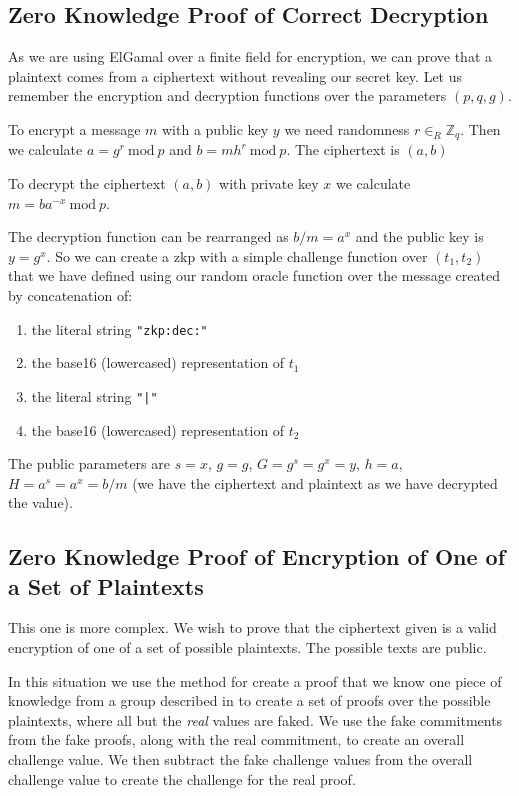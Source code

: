 \subsection*{Zero Knowledge Proof of Correct Decryption}
\label{proc:zkp:dec}

As we are using ElGamal over a finite field for encryption, we can prove that a plaintext comes from a ciphertext without revealing our secret key. Let us remember the encryption and decryption functions over the parameters $(p,q,g)$.

To encrypt a message $m$ with a public key $y$ we need randomness $r \in_{R} \mathbb{Z}_q$. Then we calculate $a = g^r\ \textrm{mod}\ p$ and $b = mh^r\ \textrm{mod}\ p$. The ciphertext is $(a,b)$

To decrypt the ciphertext $(a,b)$ with private key $x$ we calculate $m = ba^{-x}\ \textrm{mod}\ p$.

The decryption function can be rearranged as $b/m = a^x$ and the public key is $y = g^x$. So we can create a \gls{zkp} with a simple challenge function over $(t_1, t_2)$ that we have defined using our random oracle function over the message created by concatenation of:

\begin{enumerate}
    \item the literal string \lstinline[style=ES6]{"zkp:dec:"}
    \item the base16 (lowercased) representation of $t_1$
    \item the literal string \lstinline[style=ES6]{"|"}
    \item the base16 (lowercased) representation of $t_2$
\end{enumerate}

The public parameters are $s = x$, $g = g$, $G = g^s = g^x = y$, $h = a$, $H = a^s = a^x = b/m$ (we have the ciphertext and plaintext as we have decrypted the value).


\subsection*{Zero Knowledge Proof of Encryption of One of a Set of Plaintexts}
\label{proc:zkp:enc}

This one is more complex. We wish to prove that the ciphertext given is a valid encryption of one of a set of possible plaintexts. The possible texts are public.

In this situation we use the method for create a proof that we know one piece of knowledge from a group described in \cite{camenischProofSystemsGeneral} to create a set of proofs over the possible plaintexts, where all but the \emph{real} values are faked. We use the fake commitments from the fake proofs, along with the real commitment, to create an overall challenge value. We then subtract the fake challenge values from the overall challenge value to create the challenge for the real proof.

